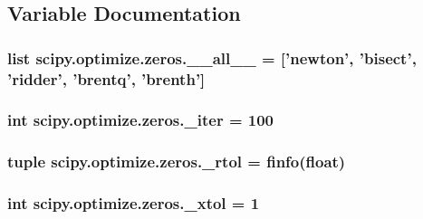 \subsection{Variable Documentation}
\hypertarget{namespacescipy_1_1optimize_1_1zeros_a20bb9fd4594454a268fa8b93df50f0d6}{}
\subsubsection[{\+\_\+\+\_\+all\+\_\+\+\_\+}]{\setlength{\rightskip}{0pt plus 5cm}list scipy.\+optimize.\+zeros.\+\_\+\+\_\+all\+\_\+\+\_\+ = \mbox{[}'{\bf newton}', '{\bf bisect}', '{\bf ridder}', '{\bf brentq}', '{\bf brenth}'\mbox{]}}\label{namespacescipy_1_1optimize_1_1zeros_a20bb9fd4594454a268fa8b93df50f0d6}
\hypertarget{namespacescipy_1_1optimize_1_1zeros_aaeb208fcd759004ff55061e4ece6af34}{}
\subsubsection[{\+\_\+iter}]{\setlength{\rightskip}{0pt plus 5cm}int scipy.\+optimize.\+zeros.\+\_\+iter = 100}\label{namespacescipy_1_1optimize_1_1zeros_aaeb208fcd759004ff55061e4ece6af34}
\hypertarget{namespacescipy_1_1optimize_1_1zeros_a8195c6fae6fc47dcfd8b6a1de741372b}{}
\subsubsection[{\+\_\+rtol}]{\setlength{\rightskip}{0pt plus 5cm}tuple scipy.\+optimize.\+zeros.\+\_\+rtol = finfo(float)}\label{namespacescipy_1_1optimize_1_1zeros_a8195c6fae6fc47dcfd8b6a1de741372b}
\hypertarget{namespacescipy_1_1optimize_1_1zeros_af117e07d5a2cbf80b5dd0a02ff847f77}{}
\subsubsection[{\+\_\+xtol}]{\setlength{\rightskip}{0pt plus 5cm}int scipy.\+optimize.\+zeros.\+\_\+xtol = 1}\label{namespacescipy_1_1optimize_1_1zeros_af117e07d5a2cbf80b5dd0a02ff847f77}
\hypertarget{namespacescipy_1_1optimize_1_1zeros_ae94fd9b4c3e606a658916b313bbb9c97}{}
